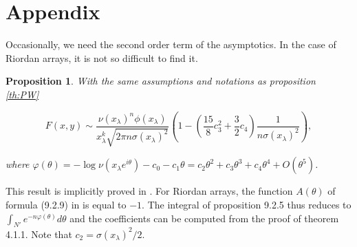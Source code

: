 \documentclass{article}
\newtheorem{proposition}{Proposition}
\begin{document}
\section{Appendix}

Occasionally, we need the second order term of the asymptotics. In the
case of Riordan arrays, it is not so difficult to find it.

\begin{proposition}
With the same assumptions and notations as proposition \ref{th:PW}

\begin{equation}
[x^ky^n]F(x,y) \sim \frac{\nu(x_\lambda)^n\phi(x_\lambda)}
  {x_\lambda^k\sqrt{2\pi n \sigma(x_\lambda)^2}}
\left(1-\left(\frac{15}{8}c_3^2+\frac{3}{2}c_4\right)
\frac{1}{n\sigma(x_\lambda)^2} \right),
\end{equation}

\noindent
where $\varphi(\theta) = -\log \nu(x_\lambda e^{i\theta}) - c_0
-c_1\theta = c_2\theta^2 + c_3\theta^3 + c_4\theta^4 + O(\theta^5)$.
\end{proposition}

This result is implicitly proved in \cite{AnalComb2013}.
For Riordan arrays, the function $A(\theta)$ of formula (9.2.9) in
is equal to $-1$. The integral of proposition 9.2.5
thus reduces to $\int_{N'}e^{-n\varphi(\theta)}d\theta$ and the
coefficients can be computed from the proof of theorem 4.1.1. Note that 
$c_2 = \sigma(x_\lambda)^2/2$.





\end{document}

